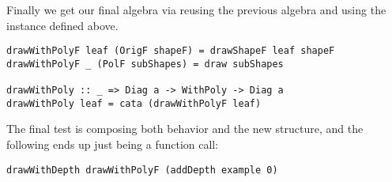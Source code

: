 Finally we get our final algebra via reusing the previous algebra and using the instance defined above.

\begin{verbatim}
drawWithPolyF leaf (OrigF shapeF) = drawShapeF leaf shapeF
drawWithPolyF _ (PolF subShapes) = draw subShapes

drawWithPoly :: _ => Diag a -> WithPoly -> Diag a
drawWithPoly leaf = cata (drawWithPolyF leaf)
\end{verbatim}

The final test is composing both behavior and the new structure, and the following ends up just being a function call:
\begin{verbatim}
drawWithDepth drawWithPolyF (addDepth example 0)
\end{verbatim}
